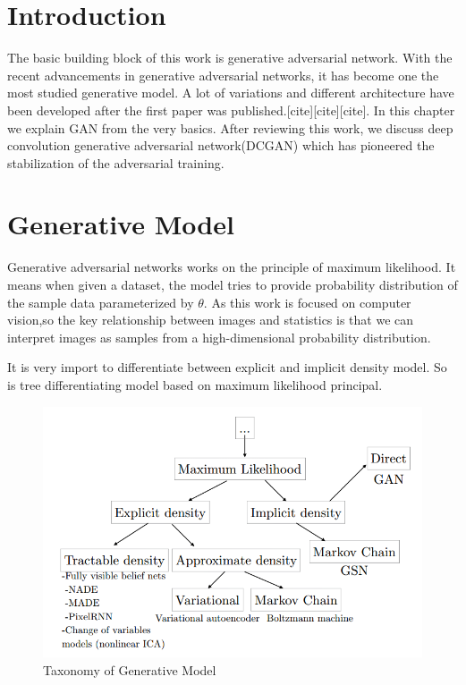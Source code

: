 

\section{Introduction}

The basic building block of this work is generative adversarial network. With the recent advancements in generative adversarial networks, it has become one the most studied generative model. A lot of variations and different architecture have been developed after the first paper was published.[cite][cite][cite]. In this chapter we explain GAN from the very basics. After reviewing this work, we discuss deep convolution generative adversarial network(DCGAN) which has pioneered the stabilization of the adversarial training.

\section{Generative Model}

Generative adversarial networks works on the principle of maximum likelihood.
It means when given a dataset, the model tries to provide probability distribution of the sample data parameterized by $\theta$. As this work is focused on computer vision,so the key relationship between images and statistics is that we can interpret images as samples from a high-dimensional probability distribution.
\par
It is very import to differentiate between explicit and implicit density model. So is tree differentiating  model based on maximum likelihood principal.
\begin{figure}[h]
    
    \includegraphics[scale=.6, angle=0]{Files/taxanomy.png}
    \caption[The panther]{Taxonomy of Generative Model\cite{GanTut}}
    \label{fig: jordan}
\end{figure}

